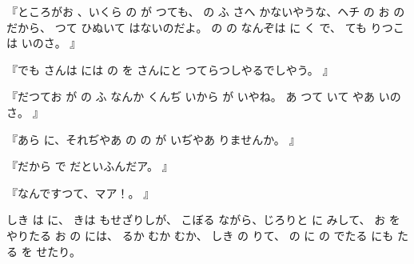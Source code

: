 『ところがお
、いくら
の
が
つても、
の
ふ
さへ
かないやうな、ヘチ
の
お
の
だから、
つて
ひぬいて
はないのだよ。
の
の
なんぞは
に
く
で、
ても
りつこは
いのさ。
』

『でも
さんは
には
の
を
さんにと
つてらつしやるでしやう。
』

『だつてお
が
の
ふ
なんか
くんぢ
いから
が
いやね。
あ
つて
いて
やあ
いのさ。
』

『あら
に、それぢやあ
の
の
が
いぢやあ
りませんか。
』

『だから
で
だといふんだア。
』

『なんですつて、マア！。
』

しき
は
に、
きは
もせざりしが、
こぼる\ninojiten{}
ながら、じろりと
に
みして、
お
を
やりたる
お
の
には、
るか
むか
むか、
しき
の
りて、
の
に
の
でたる
にも
たる
を
せたり。

